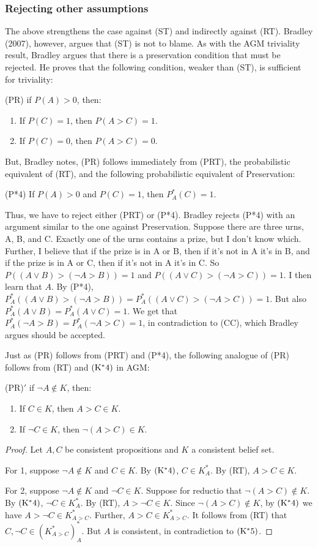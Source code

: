 \documentclass[12pt]{article}
\begin{document}
\subsubsection{Rejecting other assumptions}

The above strengthens the case against (ST) and indirectly against (RT). Bradley (2007), however, argues that (ST) is not to blame. As with the AGM triviality result, Bradley argues that there is a preservation condition that must be rejected. He proves that the following condition, weaker than (ST), is sufficient for triviality:

(PR) if $P(A)>0$, then:
\begin{enumerate}
    \item If $P(C)=1$, then $P(A>C)=1$.
    \item If $P(C)=0$, then $P(A>C)=0$.
\end{enumerate}

But, Bradley notes, (PR) follows immediately from (PRT), the probabilistic equivalent of (RT), and the following probabilistic equivalent of Preservation:

(P*4) If $P(A)>0$ and $P(C)=1$, then $P_A^*(C)=1$.

Thus, we have to reject either (PRT) or (P*4). Bradley rejects (P*4) with an argument similar to the one against Preservation. Suppose there are three urns, A, B, and C. Exactly one of the urns contains a prize, but I don't know which. Further, I believe that if the prize is in A or B, then if it's not in A it's in B, and if the prize is in A or C, then if it's not in A it's in C. So $P((A \lor B)>(\neg A > B))=1$ and $P((A \lor C)>(\neg A > C))=1$. I then learn that $A$. By (P*4), $P_A^*((A \lor B)>(\neg A > B))=P_A^*((A \lor C)>(\neg A > C))=1$. But also $P_A^*(A \lor B)=P_A^*(A \lor C)=1$. We get that $P_A^*(\neg A > B)=P_A^*(\neg A > C)=1$, in contradiction to (CC), which Bradley argues should be accepted.

Just as (PR) follows from (PRT) and (P*4), the following analogue of (PR) follows from (RT) and $\pst{*4}$ in AGM:

(PR)$'$ if $\neg A \not\in K$, then:
\begin{enumerate}
    \item If $C \in K$, then $A>C \in K$.
    \item If $\neg C \in K$, then $\neg(A>C) \in K$.
\end{enumerate}

\begin{proof} Let $A,C$ be consistent propositions and $K$ a consistent belief set.

For 1, suppose $\neg A \not\in K$ and $C\in K$. By $\pst{*4}$, $C \in K_A^*$. By (RT), $A>C \in K$.

For 2, suppose $\neg A \not\in K$ and $\neg C\in K$. Suppose for reductio that $\neg(A>C)\not\in K$. By $\pst{*4}$, $\neg C \in K_A^*$. By (RT), $A>\neg C \in K$. Since $\neg(A>C)\not\in K$, by $\pst{*4}$ we have $A>\neg C\in K_{A>C}^*$. Further, $A> C\in K_{A>C}^*$. It follows from (RT) that $C,\neg C \in (K_{A>C}^*)_A^*$. But $A$ is consistent, in contradiction to $\pst{*5}$.
\end{proof}
\end{document}
